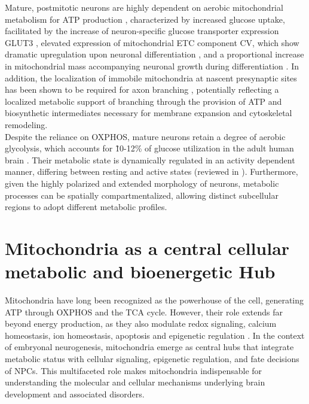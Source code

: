 Mature, postmitotic neurons are highly dependent on aerobic mitochondrial metabolism for ATP production \citep{MAGISTRETTICellularPerspectiveBrain2015}, characterized by increased glucose uptake, facilitated by the increase of neuron-specific glucose transporter expression GLUT3 \citep{AGOSTINIMetabolicReprogrammingNeuronal2016}, 
elevated expression of mitochondrial ETC component CV, which show dramatic upregulation upon neuronal differentiation , and a proportional increase in mitochondrial mass accompanying neuronal growth during differentiation \citep{ZHENGMetabolicReprogrammingNeuronal2016}.
In addition, the localization of immobile mitochondria at nascent presynaptic sites has been shown to be required for axon branching \citep{COURCHETTerminalAxonBranching2013},  potentially reflecting a localized metabolic support of branching through the provision of ATP and biosynthetic intermediates necessary for membrane expansion and cytoskeletal remodeling.
\\

Despite the reliance on OXPHOS, mature neurons retain a degree of aerobic glycolysis, which accounts for \~ 10-12\% of glucose utilization in the adult human brain \citep{VAISHNAVIRegionalAerobicGlycolysis2010}. 
Their metabolic state is dynamically regulated in an activity dependent manner, differing between resting and active states (reviewed in \citep{YELLENFuelingThoughtManagement2018}). Furthermore, given the highly polarized and extended morphology of neurons, metabolic processes can be spatially compartmentalized, allowing distinct subcellular regions to adopt different metabolic profiles.

\section{Mitochondria as a central cellular metabolic and bioenergetic Hub}
Mitochondria have long been recognized as the powerhouse of the cell, generating ATP through OXPHOS and the TCA cycle. However, their role extends far beyond energy production, as they also modulate redox signaling, calcium homeostasis, ion homeostasis, apoptosis and epigenetic regulation \citep{chandelMitochondriaSignalingOrganelles2014}.
In the context of embryonal neurogenesis, mitochondria emerge as central hubs that integrate metabolic status with cellular signaling, epigenetic regulation, and fate decisions of NPCs. This multifaceted role makes mitochondria indispensable for understanding the molecular and cellular mechanisms underlying brain development and associated disorders. 

